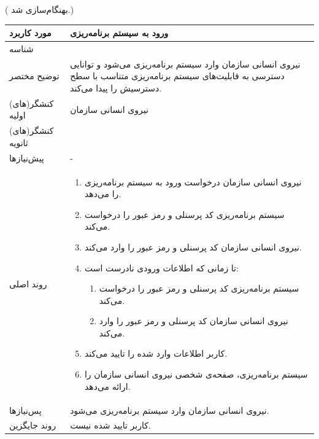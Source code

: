({\color{red} بهنگام‌سازی شد.})
\begin{table}[H]
	\centering
	\begin{tabular}{|p{3cm}|p{10cm}|}
		\hline
		مورد کاربرد & ورود به سیستم برنامه‌ریزی  \\
		\hline
		شناسه & 
		\stepcounter{usecase_ID}
		\arabic{usecase_ID} \\
		\hline
		توضیح مختصر & نیروی انسانی سازمان وارد سیستم برنامه‌ریزی می‌شود و توانایی دسترسی به قابلیت‌های سیستم برنامه‌ریزی متناسب با سطح دسترسیش را پیدا می‌کند. \\
		\hline
		کنشگر(های) اولیه & نیروی انسانی سازمان \\
		\hline
		کنشگر(های) ثانویه &  \\
		\hline
		پیش‌نیازها & - \\
		\hline
		
		روند اصلی &
		\begin{enumerate}[topsep=0cm,leftmargin=0.5cm]
			\item نیروی انسانی سازمان درخواست ورود به سیستم برنامه‌ریزی را می‌دهد.
			\item سیستم برنامه‌ریزی کد پرسنلی و رمز عبور را درخواست می‌کند. 
			\item نیروی انسانی سازمان کد پرسنلی و رمز عبور را وارد می‌کند. 
			\item تا زمانی که اطلاعات ورودی نادرست است: 
			\begin{enumerate}[topsep=0cm,leftmargin=0.5cm]
				\item سیستم برنامه‌ریزی کد پرسنلی و رمز عبور را درخواست می‌کند. 
				\item نیروی انسانی سازمان کد پرسنلی و رمز عبور را وارد می‌کند. 
			\end{enumerate}
			\item کاربر اطلاعات وارد شده را تایید می‌کند.
			\item سیستم برنامه‌ریزی، صفحه‌ی شخصی نیروی انسانی سازمان را ارائه می‌دهد. 
		\end{enumerate} \\
		
		\hline
		پس‌نیازها & نیروی انسانی سازمان وارد سیستم برنامه‌ریزی می‌شود. \\
		\hline
		روند جایگزین & کاربر تایید شده نیست. \\
		\hline
	\end{tabular}
\end{table}


